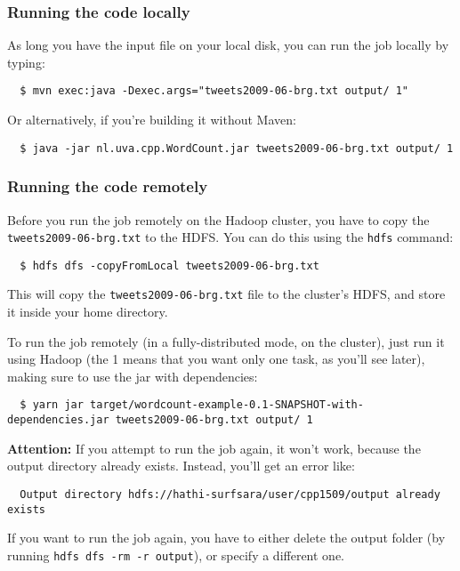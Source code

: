 \documentclass[a4paper,11pt]{article}
\begin{document}
\subsubsection{Running the code locally}

As long you have the input file on your local disk, you can run the job locally by typing:

\begin{lstlisting}
  $ mvn exec:java -Dexec.args="tweets2009-06-brg.txt output/ 1"
\end{lstlisting}

Or alternatively, if you're building it without Maven:

\begin{lstlisting}
  $ java -jar nl.uva.cpp.WordCount.jar tweets2009-06-brg.txt output/ 1 
\end{lstlisting}

\subsubsection{Running the code remotely}

Before you run the job remotely on the Hadoop cluster, you have to copy the \texttt{tweets2009-06-brg.txt} to the HDFS. You can do this
using the \texttt{hdfs} command:

\begin{lstlisting}
  $ hdfs dfs -copyFromLocal tweets2009-06-brg.txt
\end{lstlisting}

This will copy the \texttt{tweets2009-06-brg.txt} file to the cluster's HDFS, and store it inside your home directory.

To run the job remotely (in a fully-distributed mode, on the cluster), just run it using Hadoop (the 1 means that you want
only one task, as you'll see later), making sure to use the jar with dependencies:
\begin{lstlisting}
  $ yarn jar target/wordcount-example-0.1-SNAPSHOT-with-dependencies.jar tweets2009-06-brg.txt output/ 1
\end{lstlisting}

\textbf{Attention:} If you attempt to run the job again, it won't work, because the output directory already exists. Instead, you'll get an error like:
\begin{lstlisting}
  Output directory hdfs://hathi-surfsara/user/cpp1509/output already exists
\end{lstlisting}

If you want to run the job again, you have to either delete the output folder (by running \texttt{hdfs dfs -rm -r output}), or specify a different one. 
\end{document}
